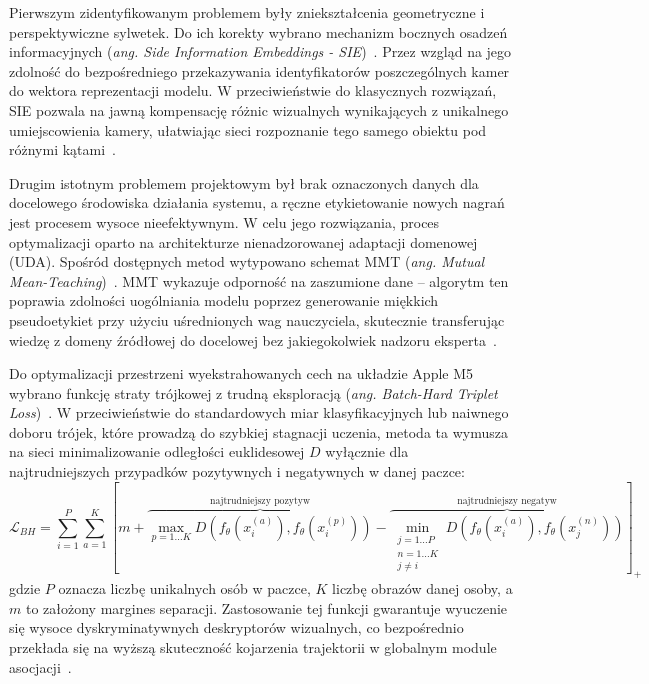 Pierwszym zidentyfikowanym problemem były zniekształcenia geometryczne i perspektywiczne sylwetek.
Do ich korekty wybrano mechanizm bocznych osadzeń informacyjnych (\textit{ang. Side Information
  Embeddings - SIE})~\cite{he2021transreid}. Przez wzgląd na jego zdolność do bezpośredniego
przekazywania identyfikatorów poszczególnych kamer do wektora reprezentacji modelu. W
przeciwieństwie do klasycznych rozwiązań, SIE pozwala na jawną kompensację różnic wizualnych
wynikających z unikalnego umiejscowienia kamery, ułatwiając sieci rozpoznanie tego samego obiektu
pod różnymi kątami~\cite{he2021transreid}.

Drugim istotnym problemem projektowym był brak oznaczonych danych dla docelowego środowiska
działania systemu, a ręczne etykietowanie nowych nagrań jest procesem wysoce nieefektywnym. W celu
jego rozwiązania, proces optymalizacji oparto na architekturze nienadzorowanej adaptacji domenowej
(UDA). Spośród dostępnych metod wytypowano schemat MMT (\textit{ang. Mutual
  Mean-Teaching})~\cite{ge2020mutual}. MMT wykazuje odporność na zaszumione dane -- algorytm ten
poprawia zdolności uogólniania modelu poprzez generowanie miękkich pseudoetykiet przy użyciu
uśrednionych wag nauczyciela, skutecznie transferując wiedzę z domeny źródłowej do docelowej bez
jakiegokolwiek nadzoru eksperta~\cite{ge2020mutual}.

Do optymalizacji przestrzeni wyekstrahowanych cech na układzie Apple M5 wybrano funkcję straty
trójkowej z trudną eksploracją (\textit{ang. Batch-Hard Triplet Loss})~\cite{hermans2017defense}. W
przeciwieństwie do standardowych miar klasyfikacyjnych lub naiwnego doboru trójek, które prowadzą
do szybkiej stagnacji uczenia, metoda ta wymusza na sieci minimalizowanie odległości euklidesowej
$D$ wyłącznie dla najtrudniejszych przypadków pozytywnych i negatywnych w danej paczce:
\begin{equation}
  \mathcal{L}_{BH} = \sum_{i=1}^{P} \sum_{a=1}^{K} \left[ m + \overbrace{\max_{p=1 \dots K} D\left(f_\theta(x_i^{(a)}), f_\theta(x_i^{(p)})\right)}^{\text{najtrudniejszy pozytyw}} - \overbrace{\min_{\substack{j=1 \dots P \\ n=1 \dots K \\ j \neq i}} D\left(f_\theta(x_i^{(a)}), f_\theta(x_j^{(n)})\right)}^{\text{najtrudniejszy negatyw}} \right]_+
  \label{eq:batch_hard_triplet}
\end{equation}
gdzie $P$ oznacza liczbę unikalnych osób w paczce, $K$ liczbę obrazów danej osoby, a $m$ to założony margines separacji. Zastosowanie tej funkcji gwarantuje wyuczenie się wysoce dyskryminatywnych deskryptorów wizualnych, co bezpośrednio przekłada się na wyższą skuteczność kojarzenia trajektorii w globalnym module asocjacji~\cite{hermans2017defense}.

